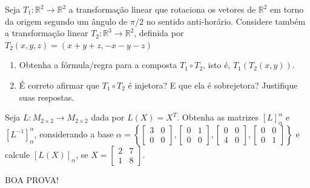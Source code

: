 \documentclass[12pt,a4paper]{article}
\newcommand{\fixme}{{\color{red}(...)}}
\newcommand*\R{\mathbb{R}}
\begin{document}
\begin{ExerciseList}
\Exercise[title={2,5}] Seja $T_1: \R^2 \to \R^2$ a transformação linear que rotaciona os vetores de $\R^2$ em torno da origem segundo um ângulo de $\pi/2$ no sentido anti-horário. Considere também a transformação linear $T_2: \R^3 \to \R^2$, definida por $T_2(x,y,z)=(x+y+z, -x-y-z)$
\begin{enumerate}
\item Obtenha a fórmula/regra para a composta $T_1 \circ T_2$, isto é, $T_1 (T_2(x,y))$.
\item É correto afirmar que $T_1 \circ T_2$ é injetora? E que ela é sobrejetora? Justifique suas respostas.
\end{enumerate}
\Answer \fixme

\Exercise[title={2,5}] Seja $L: M_{2 \times 2} \to M_{2 \times 2}$ dada por $L(X) = X^T$. Obtenha as matrizes $[L]^\alpha_\alpha$ e $[L^{-1}]^\alpha_\alpha$, considerando a base $\alpha = \left\{ 
\begin{bmatrix}
3 & 0 \\ 0 & 0
\end{bmatrix},
\begin{bmatrix}
0 & 1 \\ 0 & 0
\end{bmatrix},
\begin{bmatrix}
0 & 0 \\ 4 & 0
\end{bmatrix},
\begin{bmatrix}
0 & 0 \\ 0 & 1
\end{bmatrix}
\right\}$ e calcule $[L(X)]_\alpha$, se $X = \begin{bmatrix}
2 & 7 \\ 1 & 8
\end{bmatrix}$.
\Answer \fixme
\end{ExerciseList}

\begin{center}
BOA PROVA!
\end{center}

\end{document}
